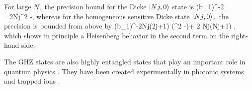 For large $N,$ the precision bound for the Dicke $\vert Nj,0 \rangle$ state is
\be
\label{eq:exact precision bound for dicke ih state}
(\Delta b_1)^{-2}_{\max} =2Nj\lpar \sigma^2
-\eta\rpar,
\ee
whereas for the homogeneous sensitive Dicke state $\vert Nj,0 \rangle_x$ the precision is bounded from above by
\be
(\Delta b_1)^{-2}\leqslant Nj(2j+1) (\sigma^2 -\eta)+ 2 Nj(Nj+1) \eta,
\ee
which shows in principle a Heisenberg behavior in the second term on
the right-hand side.
%
%
%
%
%
%
%
%


The GHZ states are also highly entangled states that play an important role in quantum physics \cite{Greenberger1990}.
They have been created experimentally in photonic systems \cite{Pan2000,Yao2012,Lu2007} and trapped ions \cite{Sackett2000,Monz2011}.

